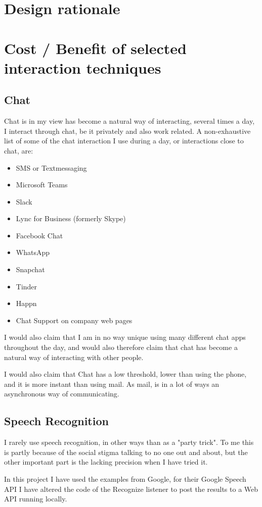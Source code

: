 \documentclass[11pt,fleqn]{book} %
\begin{document}
\section{Design rationale}

\section{Cost / Benefit of selected interaction techniques}
\subsection{Chat}
Chat is in my view has become a natural way of interacting, several times a day, I interact through chat, be it privately and also work related. A non-exhaustive list of some of the chat interaction I use during a day, or interactions close to chat, are:
\begin{itemize}
\item SMS or Textmessaging
\item Microsoft Teams
\item Slack
\item Lync for Business (formerly Skype)
\item Facebook Chat
\item WhatsApp
\item Snapchat 
\item Tinder
\item Happn
\item Chat Support on company web pages
\end{itemize}

I would also claim that I am in no way unique using many different chat apps throughout the day, and would also therefore claim that chat has become a natural way of interacting with other people.

I would also claim that Chat has a low threshold, lower than using the phone, and it is more instant than using mail. As mail, is in a lot of ways an asynchronous way of communicating.

\subsection{Speech Recognition}
I rarely use speech recognition, in other ways than as a "party trick". To me this is partly because of the social stigma talking to no one out and about, but the other important part is the lacking precision when I have tried it.

In this project I have used the examples from Google, for their Google Speech API
\cite{GoogleCloudPlatformSpeechPlatform}
I have altered the code of the Recognize listener to post the results to a Web API running locally.
\end{document}
